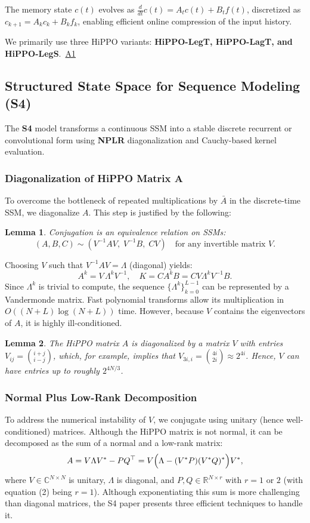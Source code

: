 \documentclass{article}
\newtheorem{lemma}{Lemma}[section]
\theoremstyle{definition}
\begin{document}
The memory state \( c(t) \) evolves as \( \frac{d}{dt} c(t) = A_t c(t) + B_t f(t) \), discretized as \( c_{k+1} = A_k c_k + B_k f_k \), enabling efficient online compression of the input history.



We primarily use three HiPPO variants: \textbf{HiPPO-LegT, HiPPO-LagT, and HiPPO-LegS}.~\hyperref[appendix:Three type of hippo]{A1}



\subsection{Structured State Space for Sequence Modeling (S4)}
The \textbf{S4} model transforms a continuous SSM into a stable discrete recurrent or convolutional form using \textbf{NPLR} diagonalization and Cauchy-based kernel evaluation.

\subsubsection{Diagonalization of HiPPO Matrix A}
To overcome the bottleneck of repeated multiplications by $\bar{A}$ in the discrete-time SSM, we diagonalize $A$. This step is justified by the following:

\begin{lemma}
Conjugation is an equivalence relation on SSMs:
\[
(A,B,C) \sim (V^{-1}AV,\; V^{-1}B,\; CV) \quad \text{for any invertible matrix } V.
\]
\end{lemma}

Choosing $V$ such that $V^{-1}AV=\Lambda$ (diagonal) yields:
\[
A^k = V\,\Lambda^k V^{-1}, \quad K = CA^kB = CV\Lambda^kV^{-1}B.
\]
Since $\Lambda^k$ is trivial to compute, the sequence $\{\Lambda^k\}_{k=0}^{L-1}$ can be represented by a Vandermonde matrix. Fast polynomial transforms allow its multiplication in \(O((N+L)\log(N+L))\) time. However, because $V$ contains the eigenvectors of $A$, it is highly ill-conditioned.

\begin{lemma} The HiPPO matrix $A$ is diagonalized by a matrix $V$ with entries $V_{ij} = \binom{i+j}{i-j}$, which, for example, implies that $V_{3i,i}=\binom{4i}{2i}\approx2^{4i}$. Hence, $V$ can have entries up to roughly $2^{4N/3}$. \end{lemma}


\subsubsection{Normal Plus Low-Rank Decomposition}
To address the numerical instability of $V$, we conjugate using unitary (hence well-conditioned) matrices. Although the HiPPO matrix is not normal, it can be decomposed as the sum of a normal and a low-rank matrix:
\[
A = V\Lambda V^* - PQ^\top = V\Bigl(\Lambda - (V^*P)(V^*Q)^*\Bigr)V^*,
\]
where $V\in\mathbb{C}^{N\times N}$ is unitary, $\Lambda$ is diagonal, and $P,Q\in\mathbb{R}^{N\times r}$ with $r=1$ or $2$ (with equation (2) being $r=1$). Although exponentiating this sum is more challenging than diagonal matrices, the S4 paper presents three efficient techniques to handle it.
\end{document}
